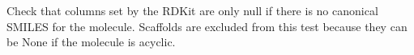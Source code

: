 \documentclass[letterpaper,10pt,english]{sphinxmanual}
\begin{document}

\begin{fulllineitems}
\label{\detokenize{sanity_checks:sanity_checks.check_rdkit_props}}
\pysigstartsignatures
{}
\pysigstopsignatures
\sphinxAtStartPar
Check that columns set by the RDKit are only null if there is no canonical SMILES for the molecule.
Scaffolds are excluded from this test because they can be None if the molecule is acyclic.

\end{fulllineitems}

\end{document}
